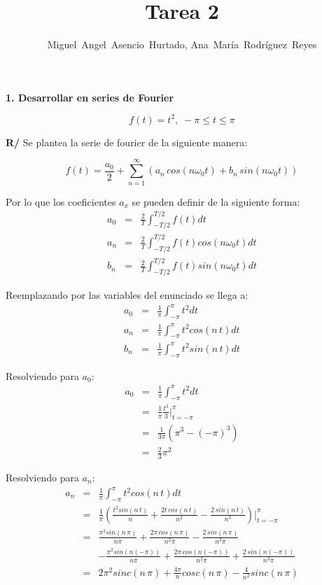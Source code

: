 \documentclass[a4paper]{article}
\title{Tarea 2}
\author{Miguel~Angel~Asencio~Hurtado, Ana~María~Rodríguez~Reyes}
\begin{document}
\maketitle
\textbf{1. Desarrollar en series de Fourier}

$$f(t) = t^2,\; -\pi \leq t \leq \pi$$

\textbf{R/} Se plantea la serie de fourier de la siguiente manera:

$$f(t) = \frac{a_0}{2} + \sum_{n=1}^\infty\left(a_n\,cos(n\omega_0t) + b_n\,sin(n\omega_0t)\right)$$

Por lo que los coeficientes $a_x$ se pueden definir de la siguiente forma:
\begin{eqnarray*}
a_0 &=& \frac{2}{T}\int_{-T/2}^{T/2}f(t)dt\\
a_n &=& \frac{2}{T}\int_{-T/2}^{T/2}f(t)cos(n\omega_0t)dt\\
b_n &=& \frac{2}{T}\int_{-T/2}^{T/2}f(t)sin(n\omega_0t)dt
\end{eqnarray*}

Reemplazando por las variables del enunciado se llega a:
\begin{eqnarray*}
a_0 &=& \frac{1}{\pi}\int_{-\pi}^{\pi}t^2dt\\
a_n &=& \frac{1}{\pi}\int_{-\pi}^{\pi}t^2cos(n\,t)dt\\
b_n &=& \frac{1}{\pi}\int_{-\pi}^{\pi}t^2sin(n\,t)dt
\end{eqnarray*}

Resolviendo para $a_0$:
\begin{eqnarray*}
a_0 &=& \frac{1}{\pi}\int_{-\pi}^{\pi}t^2dt\\
&=& \frac{1}{\pi} \frac{t^3}{3}\bigg|_{t=-\pi}^{\pi}\\
&=& \frac{1}{3\pi} (\pi^3 - (-\pi)^3)\\
&=& \frac{2}{3}\pi^2
\end{eqnarray*}

Resolviendo para $a_n$:
\begin{eqnarray*}
a_n &=& \frac{1}{\pi}\int_{-\pi}^{\pi}t^2cos(n\,t)dt\\
&=& \frac{1}{\pi} \left(\frac{t^2sin(n\,t)}{n} + \frac{2t\,cos(n\,t)}{n^2} - \frac{2\,sin(n\,t)}{n^3}\right)\bigg|_{t=-\pi}^{\pi}\\
&=& \frac{\pi^2sin(n\,\pi)}{n\pi} + \frac{2\pi\,cos(n\,\pi)}{n^2\pi} - \frac{2\,sin(n\,\pi)}{n^3\pi}\\
& &- \frac{\pi^2sin(n(-\pi))}{n\pi} + \frac{2\pi\,cos(n(-\pi))}{n^2\pi} + \frac{2\,sin(n(-\pi))}{n^3\pi}\\
&=& 2\pi^2 sinc(n\,\pi) + \frac{4\pi}{n}cosc(n\,\pi) - \frac{4}{n^2}sinc(n\,\pi)
\end{eqnarray*}
\end{document}
